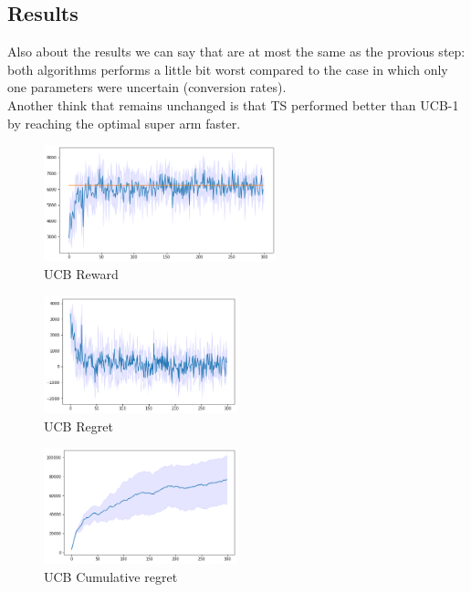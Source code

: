 \subsection{Results}
Also about the results we can say that are at most the same as the provious step: both algorithms performs a little bit worst compared to the case in which only one parameters were uncertain (conversion rates).\\ Another think that remains unchanged is that TS performed better than UCB-1 by reaching the optimal super arm faster.
\begin{figure}[ht]
    \begin{center}
    \includegraphics[width=0.6\textwidth]{img/ucb_reward5.png}
    \caption{UCB Reward}
    \label{fig:reward51}
    \end{center}
\end{figure}
\begin{multicols}{2}
    \begin{figure}[H]
        \begin{center}
        \includegraphics[width=0.5\textwidth]{img/ucb_regret5.png}
        \caption{UCB Regret}
        \label{fig:regret51}
        \end{center}
    \end{figure}
    \columnbreak
    \begin{figure}[H]
        \begin{center}
        \includegraphics[width=0.5\textwidth]{img/ucb_cum_regret5.png}
        \caption{UCB Cumulative regret}
        \label{fig:cum_reg51}
        \end{center}
    \end{figure}
\end{multicols}
